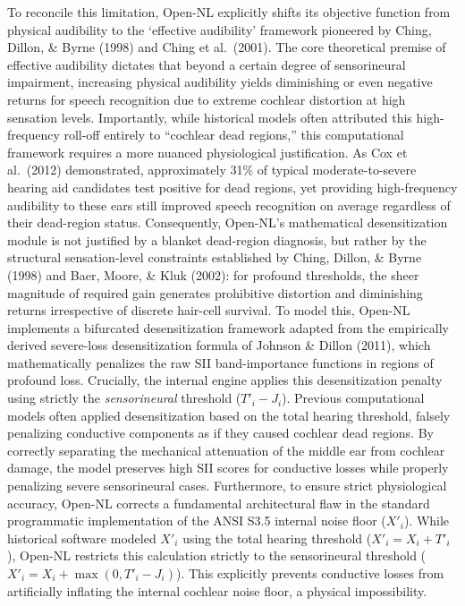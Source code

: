 \documentclass[
  12pt,
]{article}
\begin{document}
To reconcile this limitation, Open-NL explicitly shifts its objective
function from physical audibility to the `effective audibility'
framework pioneered by Ching, Dillon, \& Byrne (1998) and Ching et
al.~(2001). The core theoretical premise of effective audibility
dictates that beyond a certain degree of sensorineural impairment,
increasing physical audibility yields diminishing or even negative
returns for speech recognition due to extreme cochlear distortion at
high sensation levels. Importantly, while historical models often
attributed this high-frequency roll-off entirely to ``cochlear dead
regions,'' this computational framework requires a more nuanced
physiological justification. As Cox et al.~(2012) demonstrated,
approximately 31\% of typical moderate-to-severe hearing aid candidates
test positive for dead regions, yet providing high-frequency audibility
to these ears still improved speech recognition on average regardless of
their dead-region status. Consequently, Open-NL's mathematical
desensitization module is not justified by a blanket dead-region
diagnosis, but rather by the structural sensation-level constraints
established by Ching, Dillon, \& Byrne (1998) and Baer, Moore, \& Kluk
(2002): for profound thresholds, the sheer magnitude of required gain
generates prohibitive distortion and diminishing returns irrespective of
discrete hair-cell survival. To model this, Open-NL implements a
bifurcated desensitization framework adapted from the empirically
derived severe-loss desensitization formula of Johnson \& Dillon (2011),
which mathematically penalizes the raw SII band-importance functions in
regions of profound loss. Crucially, the internal engine applies this
desensitization penalty using strictly the \emph{sensorineural}
threshold (\(T'_i - J_i\)). Previous computational models often applied
desensitization based on the total hearing threshold, falsely penalizing
conductive components as if they caused cochlear dead regions. By
correctly separating the mechanical attenuation of the middle ear from
cochlear damage, the model preserves high SII scores for conductive
losses while properly penalizing severe sensorineural cases.
Furthermore, to ensure strict physiological accuracy, Open-NL corrects a
fundamental architectural flaw in the standard programmatic
implementation of the ANSI S3.5 internal noise floor (\(X'_i\)). While
historical software modeled \(X'_i\) using the total hearing threshold
(\(X'_i = X_i + T'_i\)), Open-NL restricts this calculation strictly to
the sensorineural threshold (\(X'_i = X_i + \max(0, T'_i - J_i)\)). This
explicitly prevents conductive losses from artificially inflating the
internal cochlear noise floor, a physical impossibility.
\end{document}
